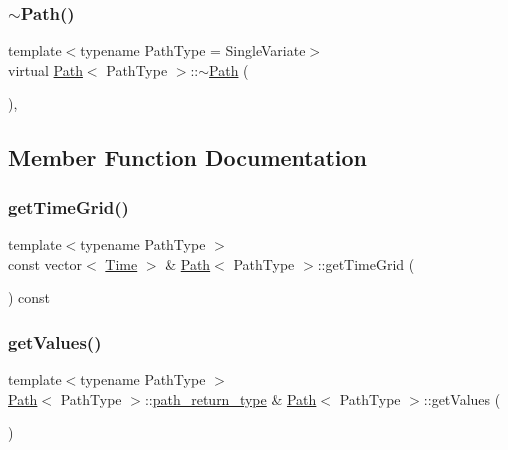\hypertarget{class_path_a83933167b70441af12427b23d88b0447}{}\label{class_path_a83933167b70441af12427b23d88b0447} 
\subsubsection{\texorpdfstring{$\sim$\+Path()}{~Path()}}
{\footnotesize\ttfamily template$<$typename Path\+Type = Single\+Variate$>$ \\
virtual \hyperlink{class_path}{Path}$<$ Path\+Type $>$\+::$\sim$\hyperlink{class_path}{Path} (\begin{DoxyParamCaption}{ }\end{DoxyParamCaption})\hspace{0.3cm}{\ttfamily [inline]}, {\ttfamily [virtual]}}



\subsection{Member Function Documentation}
\hypertarget{class_path_a511b7a93c62893bcafba4749ad1dd1b3}{}\label{class_path_a511b7a93c62893bcafba4749ad1dd1b3} 
\subsubsection{\texorpdfstring{get\+Time\+Grid()}{getTimeGrid()}}
{\footnotesize\ttfamily template$<$typename Path\+Type $>$ \\
const vector$<$ \hyperlink{_name_def_8h_ac2d3e0ba793497bcca555c7c2cf64ff3}{Time} $>$ \& \hyperlink{class_path}{Path}$<$ Path\+Type $>$\+::get\+Time\+Grid (\begin{DoxyParamCaption}{ }\end{DoxyParamCaption}) const\hspace{0.3cm}{\ttfamily [virtual]}}

\hypertarget{class_path_a8ba07fadae45801824240317c311bb84}{}\label{class_path_a8ba07fadae45801824240317c311bb84} 
\subsubsection{\texorpdfstring{get\+Values()}{getValues()}\hspace{0.1cm}{\footnotesize\ttfamily [1/2]}}
{\footnotesize\ttfamily template$<$typename Path\+Type $>$ \\
\hyperlink{class_path}{Path}$<$ Path\+Type $>$\+::\hyperlink{class_path_a3b1c34a87f7867f6fed2e0a33f801e7d}{path\+\_\+return\+\_\+type} \& \hyperlink{class_path}{Path}$<$ Path\+Type $>$\+::get\+Values (\begin{DoxyParamCaption}{ }\end{DoxyParamCaption})\hspace{0.3cm}{\ttfamily [virtual]}}

